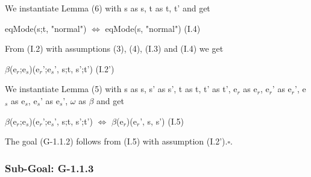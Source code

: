 \documentclass[conference]{IEEEtran}
\begin{document}
\noindent We instantiate Lemma (6) with
s as s, t as t, t' and get

\begin{center}
eqMode(s;t, "normal") $\Leftrightarrow$ eqMode(s, "normal")   \hspace*{0.4cm} (I.4)
\end{center}

\noindent From (I.2) with assumptions (3), (4), (I.3) and (I.4) we get

\begin{center}
\textlbrackdbl $\beta$\textrbrackdbl(e$_r$;e$_s$)(e$_r$';e$_s$', s;t, s';t')   \hspace*{3cm} (I.2')
\end{center}

\noindent We instantiate Lemma (5) with
s as s, s' as s', t as t, t' as t', e$_r$ as e$_r$, e$_r$' as e$_r$', e$_s$ as e$_s$, e$_s$' as e$_s$', $\omega$ as $\beta$
and get

\begin{center}
\begin{tabbing}
\textlbrackdbl $\beta$\textrbrackdbl(e$_r$;e$_s$)(e$_r$';e$_s$', s;t, s';t') $\Leftrightarrow$ \textlbrackdbl $\beta$\textrbrackdbl(e$_r$)(e$_r$', s, s')   \hspace*{0.8cm} (I.5)
\end{tabbing}
\end{center}

\noindent The goal (G-1.1.2) follows from (I.5) with assumption (I.2').$\square$.

\subsubsection*{Sub-Goal: G-1.1.3}
\end{document}
